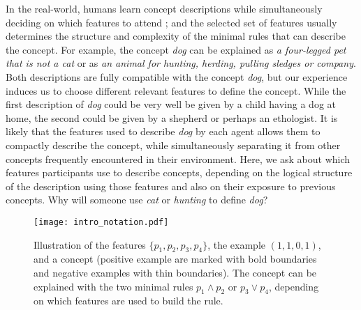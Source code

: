 In the real-world, humans learn concept descriptions while simultaneously deciding on which features to attend \cite{schyns1998development}; and the selected set of features usually determines the structure and complexity of the minimal rules that can describe the concept. For example, the concept \textit{dog} can be explained as {\em a four-legged pet that is not a cat} or as {\em an animal for hunting, herding, pulling sledges or company}. Both descriptions are fully compatible with the concept \textit{dog}, but our experience induces us to choose different relevant features to define the concept. While the first description of {\em dog} could be very well be given by a child having a dog at home, the second could be given by a shepherd or perhaps an ethologist. It is likely that the features used to describe {\em dog} by each agent allows them to compactly describe the concept, while simultaneously separating it from other concepts frequently encountered in their environment. Here, we ask about which features participants use to describe concepts, depending on the logical structure of the description using those features and also on their exposure to previous concepts. Why will someone use {\em cat} or {\em hunting} to define {\em dog}?

\begin{figure}
\begin{center}
	\texttt{[image: intro\_notation.pdf]}
\end{center}\caption{Illustration of the features $\{p_1,p_2,p_3,p_4\}$, the example $(1,1,0,1)$, and a concept (positive example are marked with bold boundaries and negative examples with thin boundaries). The concept can be explained with the two minimal rules $p_1 \land p_2$ or $p_3 \lor p_4$, depending on which features are used to build the rule.}
\label{fig:intro_notation}
\end{figure}


